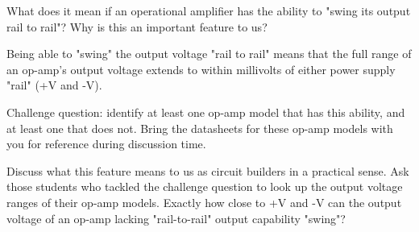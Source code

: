 

What does it mean if an operational amplifier has the ability to "swing its output rail to rail"?  Why is this an important feature to us?







Being able to "swing" the output voltage "rail to rail" means that the full range of an op-amp's output voltage extends to within millivolts of either power supply "rail" (+V and -V).

\vskip 10pt

Challenge question: identify at least one op-amp model that has this ability, and at least one that does not.  Bring the datasheets for these op-amp models with you for reference during discussion time.







Discuss what this feature means to us as circuit builders in a practical sense.  Ask those students who tackled the challenge question to look up the output voltage ranges of their op-amp models.  Exactly how close to +V and -V can the output voltage of an op-amp lacking "rail-to-rail" output capability "swing"?




